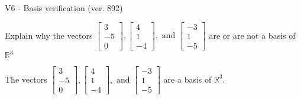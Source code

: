\begin{exercise}
  \begin{exerciseTitle}V6 - Basis verification (ver. 892)\end{exerciseTitle}
  \begin{exerciseStatement}
    Explain why the vectors \(\left[\begin{array}{r}
3 \\
-5 \\
0
\end{array}\right] , \left[\begin{array}{r}
4 \\
1 \\
-4
\end{array}\right] , \text{ and } \left[\begin{array}{r}
-3 \\
1 \\
-5
\end{array}\right]\) are or are not a basis of \(\mathbb{R}^3\)	


  \end{exerciseStatement}
  \begin{exerciseAnswer}
   The vectors \(\left[\begin{array}{r}
3 \\
-5 \\
0
\end{array}\right] , \left[\begin{array}{r}
4 \\
1 \\
-4
\end{array}\right] , \text{ and } \left[\begin{array}{r}
-3 \\
1 \\
-5
\end{array}\right]\) 
  	 are  a basis of \(\mathbb{R}^3\).
  


  \end{exerciseAnswer}
\end{exercise}